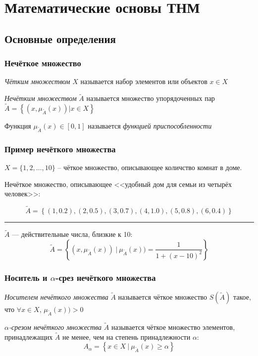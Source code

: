 \documentclass{beamer}
\begin{document}
\section{Математические основы ТНМ}

\subsection{Основные определения}

\begin{frame}\frametitle{Нечёткое множество}
    \begin{definition}
        \textit{Чётким множеством} $X$ называется набор элементов или объектов $x \in X$
    \end{definition}
    
    \begin{definition}
        \textit{Нечётким множеством} $\tilde A$ называется множество упорядоченных пар $\tilde A = \left\{ \left( x, \mu_{\tilde A}\left(x\right)\right) | x \in X \right\}$
    \end{definition}
    
    Функция $\mu_{\tilde A}\left(x\right) \in [0, 1]$ называется \textit{функцией приспособленности}
\end{frame}

\begin{frame}\frametitle{Пример нечёткого множества}
    $X = \{1, 2, \dots, 10\}$ -- чёткое множество, описывающее количство комнат в доме.
    
    Нечёткое множество, описывающее <<удобный дом для семьи из четырёх человек>>:
    
    $$\tilde A = \left\{ (1, 0.2), (2, 0.5), (3, 0.7), (4, 1.0), (5, 0.8), (6, 0.4) \right\}$$
    
    \hrule
    
    $\tilde A$ --- действительные числа, близкие к 10:
    $$\tilde A = \left\{ (x, \mu_{\tilde A}(x))\ |\ \mu_{\tilde A}(x)) = \frac{1}{1+(x-10)^2} \right\}$$
\end{frame}

\begin{frame}\frametitle{Носитель и $\alpha$-срез нечёткого множества}

    \begin{definition}
        \textit{Носителем нечёткого множества} $\tilde A$ называется чёткое множество $S(\tilde A)$ такое, что $\forall x \in X$, $\mu_{\tilde A}(x)) > 0$
    \end{definition}

    \begin{definition}
        \textit{$\alpha$-срезом нечёткого множества} $\tilde A$ называется чёткое множество элементов, принадлежащих $\tilde A$ не менее, чем на степень принадлежности $\alpha$:
        $$ A_{\alpha} = \left\{ x\in X\ |\ \mu_{\tilde A}(x) \geq \alpha \right\} $$
    \end{definition}
    
\end{frame}
\end{document}
